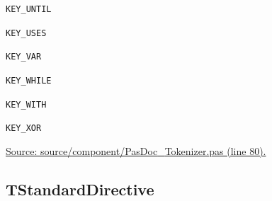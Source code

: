 \documentclass{report}
\newif\ifpdf
\begin{document}
\begin{list}{}
\begin{description}
\item[\texttt{KEY{\_}UNTIL}] \label{PasDoc_Tokenizer-KEY_UNTIL}
\index{}
 
\item[\texttt{KEY{\_}USES}] \label{PasDoc_Tokenizer-KEY_USES}
\index{}
 
\item[\texttt{KEY{\_}VAR}] \label{PasDoc_Tokenizer-KEY_VAR}
\index{}
 
\item[\texttt{KEY{\_}WHILE}] \label{PasDoc_Tokenizer-KEY_WHILE}
\index{}
 
\item[\texttt{KEY{\_}WITH}] \label{PasDoc_Tokenizer-KEY_WITH}
\index{}
 
\item[\texttt{KEY{\_}XOR}] \label{PasDoc_Tokenizer-KEY_XOR}
\index{}
 
\end{description}
\par
\href{https://github.com/pasdoc/pasdoc/blob/master/source/component/PasDoc_Tokenizer.pas#L80}{Source: source/component/PasDoc{\_}Tokenizer.pas (line 80).}

\end{list}
\ifpdf
\subsection*{\large{\textbf{TStandardDirective}}\normalsize\hspace{1ex}\hrulefill}
\else
\end{document}
